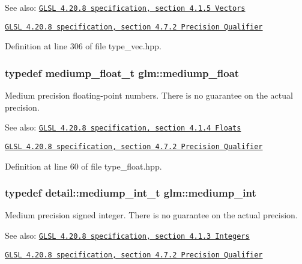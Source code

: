 \begin{Desc}
\item[See also:]\href{http://www.opengl.org/registry/doc/GLSLangSpec.4.20.8.pdf}{\tt GLSL 4.20.8 specification, section 4.1.5 Vectors} 

\href{http://www.opengl.org/registry/doc/GLSLangSpec.4.20.8.pdf}{\tt GLSL 4.20.8 specification, section 4.7.2 Precision Qualifier} \end{Desc}


Definition at line 306 of file type\_\-vec.hpp.\hypertarget{group__core__precision_gc785826c039fe6c97c03b37c81c1a68e}{
\subsubsection[mediump\_\-float]{\setlength{\rightskip}{0pt plus 5cm}typedef mediump\_\-float\_\-t {\bf glm::mediump\_\-float}}}
\label{group__core__precision_gc785826c039fe6c97c03b37c81c1a68e}


Medium precision floating-point numbers. There is no guarantee on the actual precision.

\begin{Desc}
\item[See also:]\href{http://www.opengl.org/registry/doc/GLSLangSpec.4.20.8.pdf}{\tt GLSL 4.20.8 specification, section 4.1.4 Floats} 

\href{http://www.opengl.org/registry/doc/GLSLangSpec.4.20.8.pdf}{\tt GLSL 4.20.8 specification, section 4.7.2 Precision Qualifier} \end{Desc}


Definition at line 60 of file type\_\-float.hpp.\hypertarget{group__core__precision_g2a3dcbcd7f4e17663d393a12061ac6ac}{
\subsubsection[mediump\_\-int]{\setlength{\rightskip}{0pt plus 5cm}typedef detail::mediump\_\-int\_\-t {\bf glm::mediump\_\-int}}}
\label{group__core__precision_g2a3dcbcd7f4e17663d393a12061ac6ac}


Medium precision signed integer. There is no guarantee on the actual precision.

\begin{Desc}
\item[See also:]\href{http://www.opengl.org/registry/doc/GLSLangSpec.4.20.8.pdf}{\tt GLSL 4.20.8 specification, section 4.1.3 Integers} 

\href{http://www.opengl.org/registry/doc/GLSLangSpec.4.20.8.pdf}{\tt GLSL 4.20.8 specification, section 4.7.2 Precision Qualifier} \end{Desc}


